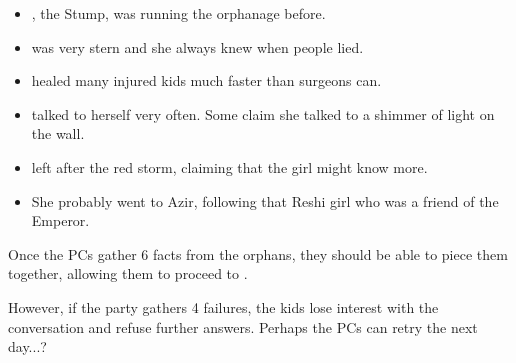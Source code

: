 \begin{itemize}
	\item \npcArshqqam{}, the Stump, was running the orphanage before.
	\item \npcArshqqam{} was very stern and she always knew when people lied.
	\item \npcArshqqam{} healed many injured kids much faster than surgeons can.
	\item \npcArshqqam{} talked to herself very often. Some claim she talked to a shimmer of light on the wall.
	\item \npcArshqqam{} left after the red storm, claiming that the girl might know more.
	\item She probably went to Azir, following that Reshi girl who was a friend of the Emperor.
\end{itemize}

Once the PCs gather 6 facts from the orphans, they should be able to piece them together, allowing them to proceed to .

However, if the party gathers 4 failures, the kids lose interest with the conversation and refuse further answers. Perhaps the PCs can retry the next day...?

